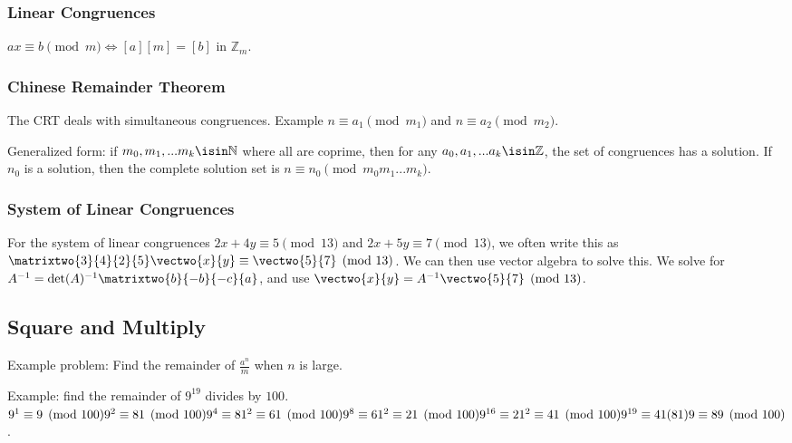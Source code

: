 \documentclass[12pt]{article}
\begin{document}
\subsubsection*{Linear Congruences}
$ax \equiv b \pmod m \iff [a][m] = [b]$ in $\mathbb{Z}_m$.


\subsubsection*{Chinese Remainder Theorem}
The CRT deals with simultaneous congruences. Example $n \equiv a_1 \pmod m_1$ and $n \equiv a_2 \pmod m_2$.


Generalized form: if $m_0, m_1, ... m_k \isin \mathbb{N}$ where all are coprime, then for any $a_0, a_1, ... a_k \isin \mathbb{Z}$, the set of congruences has a solution. If $n_0$ is a solution, then the complete solution set is $n \equiv n_0 \pmod{m_0m_1...m_k}$.

\subsubsection*{System of Linear Congruences}
For the system of linear congruences $2x + 4y \equiv 5 \pmod{13}$ and $2x + 5y \equiv 7 \pmod{13}$, we often write this as $\matrixtwo{3}{4}{2}{5} \vectwo{x}{y} \equiv \vectwo{5}{7} \pmod{13}$. We can then use vector algebra to solve this. We solve for $A^{-1} = \det(A)^{-1} \matrixtwo{b}{-b}{-c}{a}$, and use $\vectwo{x}{y} = A^{-1} \vectwo{5}{7} \pmod{13}$.

\subsection*{Square and Multiply}
Example problem: Find the remainder of $\frac{a^n}{m}$ when $n$ is large.

Example: find the remainder of $9^19$ divides by $100$.\\
$9^1 \equiv 9 \pmod{100}\\
9^2 \equiv 81 \pmod{100}\\
9^4 \equiv 81^2 \equiv 61 \pmod{100}\\
9^8 \equiv 61^2 \equiv 21 \pmod{100}\\
9^{16} \equiv 21^2 \equiv 41 \pmod{100}\\
9^{19} \equiv 41(81)9 \equiv 89 \pmod{100}$.
\end{document}

